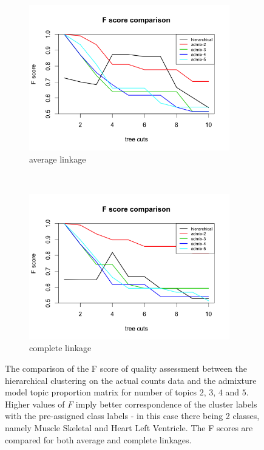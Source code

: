  \begin{figure}[ht]
    \centering
    \begin{subfigure}[t]{0.5\textwidth}
        \centering
        \includegraphics[height=2.5in]{../plots/Fscore_compare_average.png}
        \caption{average linkage}
    \end{subfigure}%
    ~ 
    \begin{subfigure}[t]{0.5\textwidth}
        \centering
        \includegraphics[height=2.5in]{../plots/Fscore_compare_complete.png}
        \caption{complete linkage}
    \end{subfigure} 
 \caption{The comparison of the F score of quality assessment between the hierarchical clustering on the actual counts data and the admixture model topic proportion matrix for number of topics $2$, $3$, $4$ and $5$. Higher values of $F$ imply better correspondence of the cluster labels with the pre-assigned class labels - in this case there being 2 classes, namely Muscle Skeletal and Heart Left Ventricle. The F scores are compared for both average and complete linkages.}
\end{figure}

